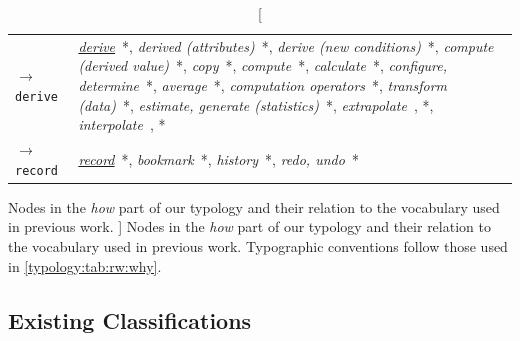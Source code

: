 \begin{table}
\begin{center}
\begin{tabular}{p{}>{\RaggedRight}p{}}
        {\tt $\rightarrow$ derive}\index{{\tt derive}} &
    
        	{\it \underline{derive}}~\cite{Heer2012}*,
        	{\it derived (attributes)}~\cite{Chuah1996}*,
        	{\it derive (new conditions)}~\cite{Springmeyer1992}*,
        	{\it compute (derived value)}~\cite{Amar2005,Lee2006,Pike2009}*,
        	{\it copy}~\cite{Raskin2000}*,
        	{\it compute}~\cite{Zhou1998}*,
        	{\it calculate}~\cite{Mullins1993,Roth2012,Roth2013,Springmeyer1992}*,
        	{\it configure, determine}~\cite{Valiati2006}*, %
        	{\it average}~\cite{Card1999}*,
        	{\it computation operators}~\cite{Casner1991}*,
        	{\it transform (data)}~\cite{Chi1998}*,
        	{\it estimate, generate (statistics)}~\cite{Springmeyer1992}*,
        	{\it extrapolate}~\cite{Mullins1993}, *\cite{Friel2001},
        	{\it interpolate}~\cite{Mullins1993}, *\cite{Friel2001}
    
    \\ \rowcolor{gray!10}
    
        {\tt $\rightarrow$ record}\index{{\tt record}} &
    
        	{\it \underline{record}}~\cite{Heer2012,Mullins1993,Springmeyer1992}*,
        	{\it bookmark}~\cite{Gotz2008}*,
        	{\it history}~\cite{Shneiderman1996}*,
        	{\it redo, undo}~\cite{Gotz2008,Yi2007}*
    
    \\
    
    \end{tabular}
    
    \caption
    [
        Nodes in the \textsl{how} part of our typology and their relation to the vocabulary used in previous work.
    ]
    {
        Nodes in the \textsl{how} part of our typology and their relation to the vocabulary used in previous work.
        Typographic conventions follow those used in \autoref{typology:tab:rw:why}.
    }
    \label{typology:tab:rw:how}
    \end{center}
\end{table}




\subsection{Existing Classifications}
\label{typology:rw:taxonomies}

